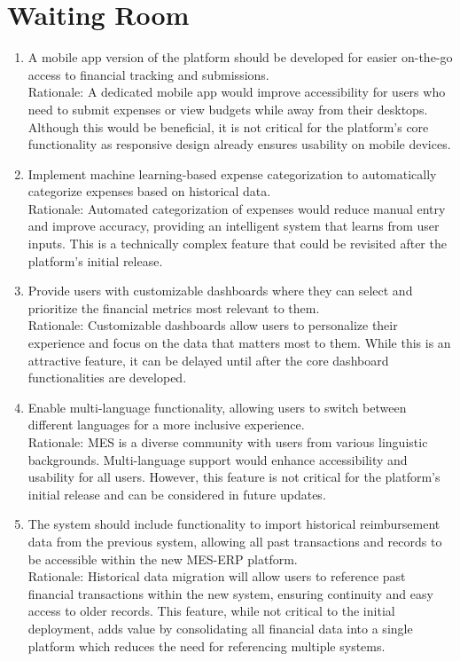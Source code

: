 \documentclass[12pt]{article}
\begin{document}
\section{Waiting Room}
\begin{enumerate}
  \item A mobile app version of the platform should be developed for easier on-the-go access to financial tracking and submissions. \\
  Rationale: A dedicated mobile app would improve accessibility for users who need to submit expenses or view budgets while away from their desktops. Although this would be beneficial, it is not critical for the platform's core functionality as responsive design already ensures usability on mobile devices.
  \item Implement machine learning-based expense categorization to automatically categorize expenses based on historical data. \\
  Rationale: Automated categorization of expenses would reduce manual entry and improve accuracy, providing an intelligent system that learns from user inputs. This is a technically complex feature that could be revisited after the platform's initial release.
  \item Provide users with customizable dashboards where they can select and prioritize the financial metrics most relevant to them. \\
  Rationale: Customizable dashboards allow users to personalize their experience and focus on the data that matters most to them. While this is an attractive feature, it can be delayed until after the core dashboard functionalities are developed.
  \item Enable multi-language functionality, allowing users to switch between different languages for a more inclusive experience. \\
  Rationale: MES is a diverse community with users from various linguistic backgrounds. Multi-language support would enhance accessibility and usability for all users. However, this feature is not critical for the platform's initial release and can be considered in future updates.
  \item The system should include functionality to import historical reimbursement data from the previous system, allowing all past transactions and records to be accessible within the new MES-ERP platform. \\
  Rationale: Historical data migration will allow users to reference past financial transactions within the new system, ensuring continuity and easy access to older records. This feature, while not critical to the initial deployment, adds value by consolidating all financial data into a single platform which reduces the need for referencing multiple systems.
\end{enumerate}
\end{document}
